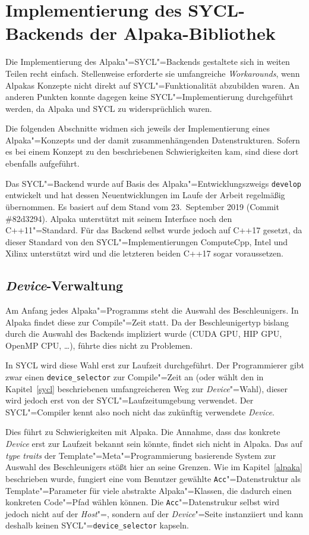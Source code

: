 \chapter{Implementierung des SYCL-Backends der Alpaka-Bibliothek}
\label{implementierung}

Die Implementierung des Alpaka"=SYCL"=Backends gestaltete sich in weiten Teilen
recht einfach. Stellenweise erforderte sie umfangreiche \textit{Workarounds},
wenn Alpakas Konzepte nicht direkt auf SYCL"=Funktionalität abzubilden waren.
An anderen Punkten konnte dagegen keine SYCL"=Implementierung durchgeführt
werden, da Alpaka und SYCL zu widersprüchlich waren.

Die folgenden Abschnitte widmen sich jeweils der Implementierung eines
Alpaka"=Konzepts und der damit zusammenhängenden Datenstrukturen. Sofern es bei
einem Konzept zu den beschriebenen Schwierigkeiten kam, sind diese dort
ebenfalls aufgeführt.

Das SYCL"=Backend wurde auf Basis des Alpaka"=Entwicklungszweigs
\texttt{develop} entwickelt und hat dessen Neuentwicklungen im Laufe der Arbeit
regelmäßig übernommen. Es basiert auf dem Stand vom 23.\ September 2019
(Commit \#82d3294). Alpaka unterstützt mit seinem Interface noch den
C++11"=Standard. Für das Backend selbst wurde jedoch auf C++17 gesetzt, da
dieser Standard von den SYCL"=Implementierungen ComputeCpp, Intel und Xilinx
unterstützt wird und die letzteren beiden C++17 sogar voraussetzen.

\section{\textit{Device}-Verwaltung}
\label{implementierung:device}

Am Anfang jedes Alpaka"=Programms steht die Auswahl des Beschleunigers. In
Alpaka findet diese zur Compile"=Zeit statt. Da der Beschleunigertyp bislang
durch die Auswahl des Backends impliziert wurde (CUDA \textrightarrow{} GPU,
HIP \textrightarrow{} GPU, OpenMP \textrightarrow{} CPU, \ldots), führte dies
nicht zu Problemen.

In SYCL wird diese Wahl erst zur Laufzeit durchgeführt. Der Programmierer gibt
zwar einen \texttt{device\_selector} zur Compile"=Zeit an (oder wählt den
in Kapitel~\ref{sycl} beschriebenen umfangreicheren Weg zur
\textit{Device}"=Wahl), dieser wird jedoch erst von der SYCL"=Laufzeitumgebung
verwendet. Der SYCL"=Compiler kennt also noch nicht das zukünftig verwendete
\textit{Device}.

Dies führt zu Schwierigkeiten mit Alpaka. Die Annahme, dass das konkrete
\textit{Device} erst zur Laufzeit bekannt sein könnte, findet sich nicht in
Alpaka. Das auf \textit{type traits} der Template"=Meta"=Programmierung
basierende System zur Auswahl des Beschleunigers stößt hier an seine Grenzen.
Wie im Kapitel~\ref{alpaka} beschrieben wurde, fungiert eine vom Benutzer
gewählte \texttt{Acc}"=Datenstruktur als Template"=Parameter für viele
abstrakte Alpaka"=Klassen, die dadurch einen konkreten Code"=Pfad wählen können.
Die \texttt{Acc}"=Datenstrukur selbst wird jedoch nicht auf der
\textit{Host}"=, sondern auf der \textit{Device}"=Seite instanziiert und kann
deshalb keinen SYCL"=\texttt{device\_selector} kapseln.

